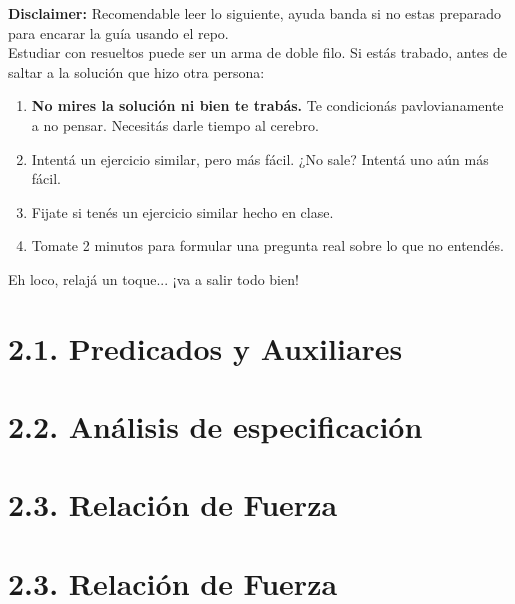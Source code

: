 \vspace{0.5cm}


\begin{disclaimerbox}
\textbf{Disclaimer:} Recomendable leer lo siguiente, ayuda banda si no estas preparado para encarar la guía usando el repo. \\

Estudiar con resueltos puede ser un arma de doble filo. Si estás trabado, antes de saltar a la solución que hizo otra persona:
\begin{enumerate}
    \item \textbf{No mires la solución ni bien te trabás.} Te condicionás pavlovianamente a no pensar. Necesitás darle tiempo al cerebro.
    \item Intentá un ejercicio similar, pero más fácil. ¿No sale? Intentá uno aún más fácil.
    \item Fijate si tenés un ejercicio similar hecho en clase.
    \item Tomate 2 minutos para formular una pregunta real sobre lo que no entendés.
\end{enumerate}
Eh loco, relajá un toque... ¡va a salir todo bien!
\end{disclaimerbox}

\newpage

\section*{2.1.  Predicados y Auxiliares}






\newpage

\newpage

\section*{2.2.  Análisis de especificación}






\newpage
\section*{2.3.  Relación de Fuerza}




\newpage
\section*{2.3.  Relación de Fuerza}






